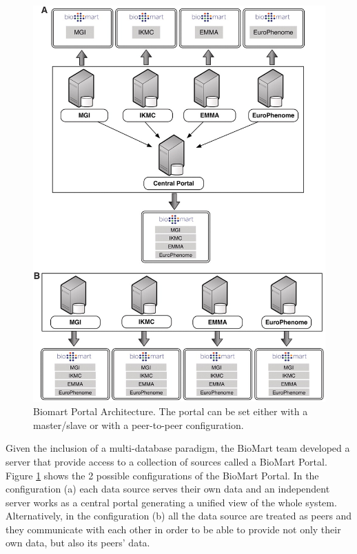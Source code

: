 \begin{figure}  
\includegraphics[width=\textwidth]{figures/biomart.png}
\caption[Biomart Portal Architecture.]{Biomart Portal Architecture. The portal can be set either with a master/slave or with a peer-to-peer configuration.
\label{fig:biomart}}
\end{figure}

Given the inclusion of a multi-database paradigm, the BioMart team developed a server that provide access to a collection of sources called a BioMart Portal. Figure \ref{fig:biomart} shows the 2 possible configurations of the BioMart Portal. In the configuration (a) each data source serves their own data and an independent server works as a central portal generating a unified view of the whole system. Alternatively, in the configuration (b) all the data source are treated as peers and they communicate with each other in order to be able to provide not only their own data, but also its peers' data.


